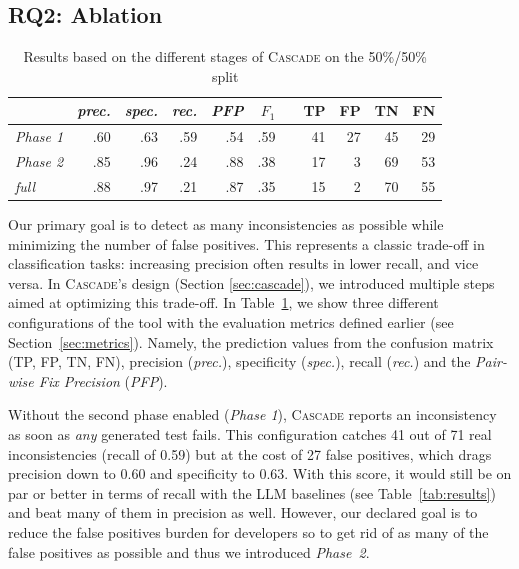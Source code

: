 \documentclass[acmsmall, screen]{acmart}
\newcommand{\tool}{\textsc{Cascade}\xspace}
\begin{document}
\subsection{RQ2: Ablation}
\label{sec:ablation}
\begin{table}[tb]

\centering 
\caption{Results based on the different stages of \tool on the 50\%/50\% split} \label{tab:ablation} 
\begin{tabular}{@{}l@{\hskip -2pt}r@{\hskip -1pt}r@{\hskip -1pt}r@{\hskip -1pt}r@{\hskip -1pt}rc@{\hskip -2pt}r@{\hskip -1pt}r@{\hskip -1pt}r@{\hskip -1pt}r@{}}
\toprule
  & \phantom{n} \textit{prec.}  &   \phantom{n} \textit{spec.} & \phantom{n} \textit{rec.} & \phantom{n} \textit{PFP} & \phantom{n} $F_1$  &  & \phantom{n} TP & \phantom{n} FP    & \phantom{n} TN & \phantom{n} FN \\ \midrule
\textit{Phase 1}
& .60 & .63 & .59  & .54 & .59 & &41 & 27  & 45 & 29   \\
\textit{Phase 2}
& .85& .96 & .24 & .88& .38 & & 17& 3& 69& 53  \\
\textit{full }  
& .88 & .97   & .21 & .87 & .35 & & 15 & 2& 70 & 55\\\bottomrule

\end{tabular}

\end{table}


Our primary goal is to detect as many inconsistencies as possible while minimizing the number of false positives. This represents a classic trade-off in classification tasks: increasing precision often results in lower recall, and vice versa.
In \tool's design (Section \ref{sec:cascade}), we introduced multiple steps aimed at optimizing this trade-off. 
In Table~\ref{tab:ablation}, we show three different configurations of the tool with the evaluation metrics defined earlier (see Section~\ref{sec:metrics}). Namely, the prediction values from the confusion matrix (TP, FP, TN, FN), precision (\textit{prec.}), specificity (\textit{spec.}), recall (\textit{rec.}) and the \textit{Pair-wise Fix Precision} (\textit{PFP}).

Without the second phase enabled (\textit{Phase 1}), \tool reports an inconsistency as soon as \emph{any} generated test fails.  
This configuration catches 41 out of 71 real inconsistencies (recall of 0.59) but at the cost of 27 false positives, which drags precision down to 0.60 and specificity to 0.63. With this score, it would still be on par or better in terms of recall with the LLM baselines (see Table~\ref{tab:results}) and beat many of them in precision as well. However, our declared goal is to reduce the false positives burden for developers so to get rid of as many of the false positives as possible and thus we introduced \textit{Phase~2}. 
\end{document}
